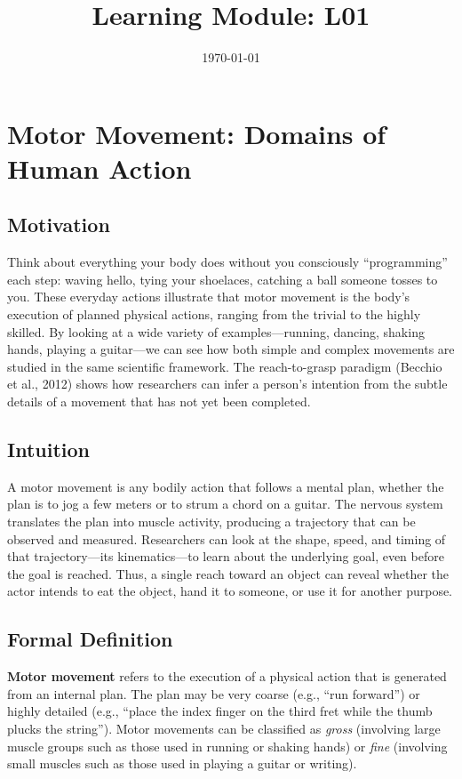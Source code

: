 \documentclass[12pt, a4paper]{article}
\title{Learning Module: L01}
\author{}
\date{\today}
\begin{document}
\maketitle
\thispagestyle{empty}
\newpage

\tableofcontents
\newpage


\section{Motor Movement: Domains of Human Action}

\subsection{Motivation}
Think about everything your body does without you consciously ``programming'' each step: waving hello, tying your shoelaces, catching a ball someone tosses to you.  These everyday actions illustrate that motor movement is the body's execution of planned physical actions, ranging from the trivial to the highly skilled.  By looking at a wide variety of examples---running, dancing, shaking hands, playing a guitar---we can see how both simple and complex movements are studied in the same scientific framework.  The reach-to-grasp paradigm (Becchio et al., 2012) shows how researchers can infer a person's intention from the subtle details of a movement that has not yet been completed.

\subsection{Intuition}
A motor movement is any bodily action that follows a mental plan, whether the plan is to jog a few meters or to strum a chord on a guitar.  The nervous system translates the plan into muscle activity, producing a trajectory that can be observed and measured.  Researchers can look at the shape, speed, and timing of that trajectory---its kinematics---to learn about the underlying goal, even before the goal is reached.  Thus, a single reach toward an object can reveal whether the actor intends to eat the object, hand it to someone, or use it for another purpose.

\subsection{Formal Definition}
\textbf{Motor movement} refers to the execution of a physical action that is generated from an internal plan.  The plan may be very coarse (e.g., ``run forward'') or highly detailed (e.g., ``place the index finger on the third fret while the thumb plucks the string'').  Motor movements can be classified as \textit{gross} (involving large muscle groups such as those used in running or shaking hands) or \textit{fine} (involving small muscles such as those used in playing a guitar or writing).  
\end{document}
